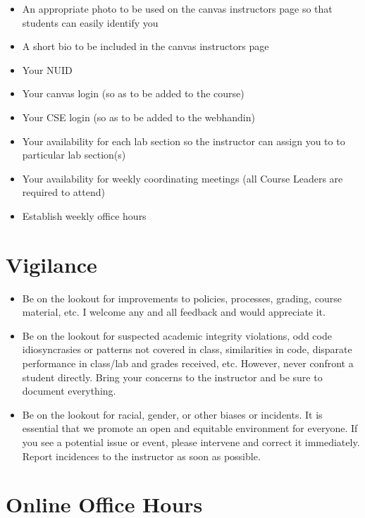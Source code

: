 \documentclass[12pt]{scrartcl}
\begin{document}
\begin{itemize}
  \item An appropriate photo to be used on the canvas instructors 
    page so that students can easily identify you
  \item A short bio to be included in the canvas instructors page 
  \item Your NUID
  \item Your canvas login (so as to be added to the course)
  \item Your CSE login (so as to be added to the webhandin)
  \item Your availability for each lab section so the instructor can 
    assign you to to particular lab section(s) 
  \item Your availability for weekly coordinating meetings (all Course 
    Leaders are required to attend)
  \item Establish weekly office hours
\end{itemize}

\section*{Vigilance}

\begin{itemize}
  \item Be on the lookout for improvements to policies, processes, 
    grading, course material, etc.  I welcome any and all feedback and would
    appreciate it.
  \item Be on the lookout for suspected academic integrity violations, odd
    code idiosyncrasies or patterns not covered in class, similarities in code, 
    disparate performance in class/lab and grades received, etc.  However,
    never confront a student directly.  Bring your concerns to the instructor and
    be sure to document everything.
  \item Be on the lookout for racial, gender, or other biases or incidents.  
    It is essential that we promote an open and equitable environment for everyone.
    If you see a potential issue or event, please intervene and correct it immediately.
    Report incidences to the instructor as soon as possible.  
\end{itemize}

\section*{Online Office Hours}
\end{document}
